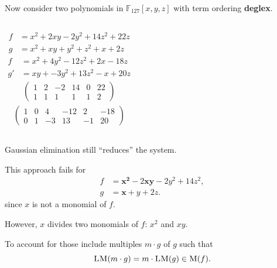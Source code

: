 \documentclass[9pt]{beamer}
\newcommand{\field}[1]{\mathbb{#1}}
\newcommand{\M}[1]{\ensuremath{\textsc{M}(#1)\xspace}}
\newcommand{\LM}[1]{\ensuremath{\textsc{LM}(#1)\xspace}}
\begin{document}
\begin{frame}
\framebreak

Now consider two polynomials in $\field{F}_{127}[x,y,z]$ with term ordering \textbf{deglex}.

\begin{columns}
\begin{align*}
f &= x^2 + 2xy - 2y^2 + 14z^2 + 22z\\
g &= x^2 + xy + y^2 + z^2 + x + 2z
\end{align*}
\begin{align*}
f &= x^2 + 4 y^2  -12 z^2 + 2 x - 18 z \\
g'&= x y + -3 y^{2} + 13 z^{2} - x + 20 z
\end{align*}
\begin{align*}
\left(\begin{array}{rrrrrr}
1 & 2 & -2 & 14 & 0 & 22 \\
1 & 1 &  1 &  1 & 1 &  2
\end{array}\right)
\end{align*}
\begin{align*}
\left(\begin{array}{rrrrrr}
1 & 0 &  4 & -12 &  2 & -18 \\
0 & 1 & -3 &  13 & -1 &  20
\end{array}\right)
\end{align*}
\end{columns}

\vspace{1em}

\begin{block}{}
Gaussian elimination still ``reduces'' the system.
\end{block}


\framebreak

This approach fails for
\begin{align*}
f &= \mathbf{x^2} - 2\mathbf{xy} - 2y^2 + 14z^2,\\
g &= \mathbf{x} + y + 2z.
\end{align*}
since $x$ is not a monomial of $f$. 

\vspace{1em}

However, $x$ divides two monomials of $f$: $x^2$ and $xy$. 

\vspace{1em}

To account for those include multiples $m \cdot g$ of $g$ such that $$\LM{m \cdot g} = m \cdot \LM{g} \in \M{f}.$$


\end{frame}
\end{document}
